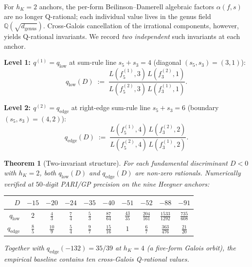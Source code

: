 \documentclass[11pt]{amsart}
\newtheorem{theorem}{Theorem}
\theoremstyle{definition}
\theoremstyle{remark}
\newcommand{\Q}{\mathbb{Q}}
\begin{document}
For $h_K = 2$ anchors, the per-form Beilinson--Damerell algebraic
factors $\alpha(f, s)$ are no longer Q-rational; each individual
value lives in the genus field $\Q(\sqrt{d_{\mathrm{genus}}})$.
Cross-Galois cancellation of the irrational components, however,
yields Q-rational invariants. We record \emph{two independent}
such invariants at each anchor.

\textbf{Level 1: $q^{(1)} = q_{\mathrm{low}}$} at sum-rule line
$s_5 + s_3 = 4$ (diagonal $(s_5, s_3) = (3, 1)$):
\begin{equation}\label{eq:q-low-P5}
q_{\mathrm{low}}(D) \;:=\;
\frac{L(f_5^{(1)}, 3)\,L(f_3^{(2)}, 1)}{L(f_5^{(2)}, 3)\,L(f_3^{(1)}, 1)}.
\end{equation}

\textbf{Level 2: $q^{(2)} = q_{\mathrm{edge}}$} at right-edge sum-rule
line $s_5 + s_3 = 6$ (boundary $(s_5, s_3) = (4, 2)$):
\begin{equation}\label{eq:q-edge-P5}
q_{\mathrm{edge}}(D) \;:=\;
\frac{L(f_5^{(1)}, 4)\,L(f_3^{(2)}, 2)}{L(f_5^{(2)}, 4)\,L(f_3^{(1)}, 2)}.
\end{equation}

\begin{theorem}[Two-invariant structure]\label{thm:two-invariant}
For each fundamental discriminant $D < 0$ with $h_K = 2$, both
$q_{\mathrm{low}}(D)$ and $q_{\mathrm{edge}}(D)$ are non-zero rationals.
Numerically verified at $50$-digit PARI/GP precision on the
nine Heegner anchors:
\begin{center}
\begin{tabular}{rccccccccc}
\toprule
$D$ & $-15$ & $-20$ & $-24$ & $-35$ & $-40$ & $-51$ & $-52$ & $-88$ & $-91$\\
\midrule
$q_{\mathrm{low}}$ & $2$ & $\frac{4}{3}$ & $\frac{7}{4}$ & $\frac{5}{3}$ & $\frac{87}{64}$ & $\frac{43}{35}$ & $\frac{204}{161}$ & $\frac{1533}{1292}$ & $\frac{735}{608}$\\[2pt]
$q_{\mathrm{edge}}$ & $\frac{8}{5}$ & $\frac{10}{9}$ & $\frac{5}{4}$ & $\frac{9}{7}$ & $\frac{15}{16}$ & $1$ & $\frac{6}{7}$ & $\frac{363}{476}$ & $\frac{21}{20}$\\
\bottomrule
\end{tabular}
\end{center}
Together with $q_{\mathrm{edge}}(-132) = 35/39$ at $h_K = 4$
(a five-form Galois orbit), the empirical baseline contains
ten cross-Galois Q-rational values.
\end{theorem}
\end{document}
